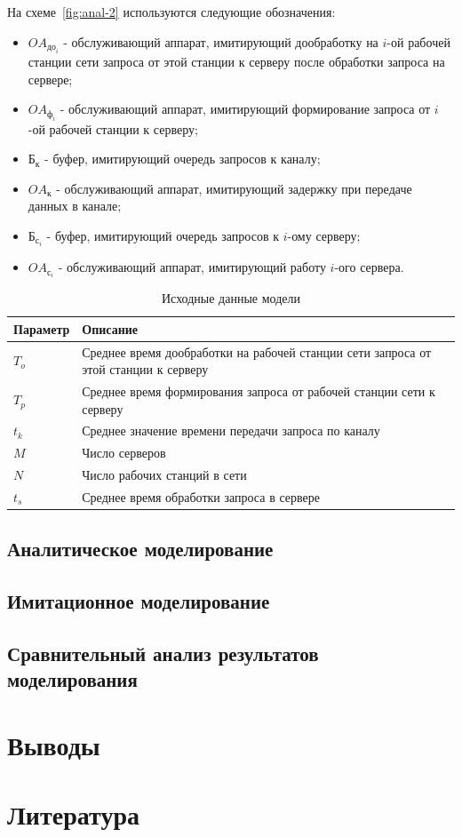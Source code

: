 \documentclass[russian,utf8,emptystyle]{eskdtext}
\begin{document}
На схеме~\ref{fig:anal-2} используются следующие обозначения:
\begin{itemize}[label=-]
\item $OA_{\text{до}_i}$ - обслуживающий аппарат, имитирующий дообработку на $i$-ой рабочей станции сети запроса от этой станции к серверу после обработки запроса на сервере;
\item $OA_{\text{ф}_i}$ - обслуживающий аппарат, имитирующий формирование запроса от $i$-ой рабочей станции к серверу;
\item $\text{Б}_\text{к}$ - буфер, имитирующий очередь запросов к каналу;
\item $OA_\text{к}$ - обслуживающий аппарат, имитирующий задержку при передаче данных в канале;
\item $\text{Б}_{\text{с}_i}$ - буфер, имитирующий очередь запросов к $i$-ому серверу;
\item $OA_{\text{с}_i}$ - обслуживающий аппарат, имитирующий работу $i$-ого сервера.
\end{itemize}

\begin{longtable}{p{2cm}|p{15cm}}
\caption{Исходные данные модели}
\label{tab:anal-input} 
\\
Параметр & Описание \\
\hline
$T_o$ & Среднее время дообработки на рабочей станции сети запроса от этой станции к серверу \\
$T_p$ & Среднее время формирования запроса от рабочей станции сети к серверу \\
$t_k$ & Среднее значение времени передачи запроса по каналу \\
$M$   & Число серверов \\
$N$   & Число рабочих станций в сети \\
$t_s$ & Среднее время обработки запроса в сервере
\end{longtable}
\subsection{Аналитическое моделирование}
\subsection{Имитационное моделирование}
\subsection{Сравнительный анализ результатов моделирования}

\clearpage
\section{Выводы}

\clearpage
\section{Литература}
\end{document}
